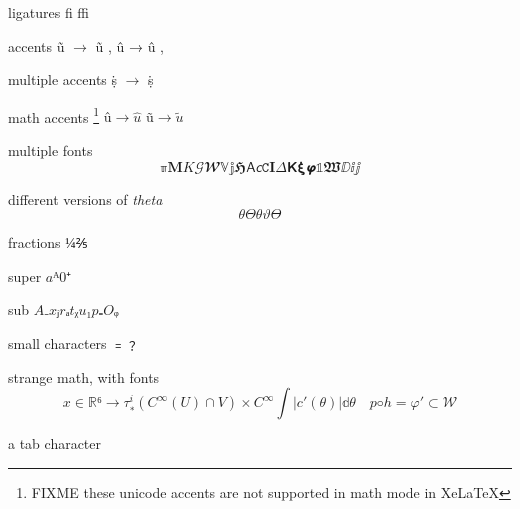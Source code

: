 \documentclass[a4paper,english]{article}
\begin{document}
ligatures ﬁ ﬃ

accents ũ  \(\rightarrow \) \~u  ,  û → \^ u , 

multiple accents ṩ \(→\)  \.{\d{s}}

math accents
\footnote{ FIXME these unicode accents are not supported in
 math mode in \textsf{XeLaTeX}}
 \( û → \hat u  \) 
 \( ũ \rightarrow  \tilde  u  \) 

 
multiple fonts
\[ ℼ 𝐌 𝐾 𝒢 𝓦 𝕍 𝕛 𝕳 𝖠 𝘤 𝙲 𝚰 𝛥 𝝟 𝝽 𝞿 𝟙 𝖂 ⅅ ⅈ ⅉ\]



different versions of \emph{theta}
\[\theta Θ  θ  ϑ  ϴ \]

fractions
\(¼ ⅖ \)

super \(aᴬ 0⁺\)



sub \(A₋ xⱼ rₐ tᵪ u₁ p₌ Oᵩ\)

small characters ﹦﹖

strange math, with fonts
\[𝑥 ∈ ℝ⁶→  τ_∗^ i (C ^ ∞ (U ) ∩ V) × 𝐶^ ∞  ∫ |𝑐' (𝜃)| 𝕕𝜃 \quad 𝑝◦ℎ = 𝜑' ⊂ 𝒲\]

a	tab character
\end{document}
